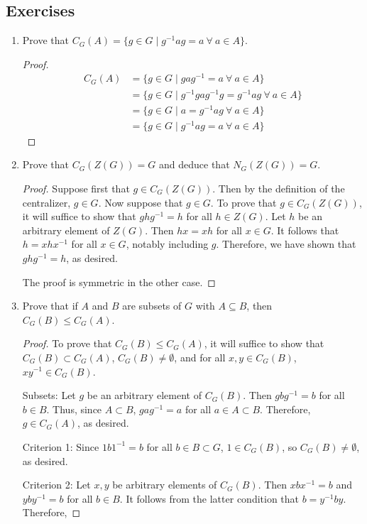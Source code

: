 \documentclass[../notes.tex]{subfiles}
\begin{document}
\subsection*{Exercises}
\begin{enumerate}[label={\textbf{\arabic*.}}]
    \item Prove that $C_G(A)=\{g\in G\mid g^{-1}ag=a\ \forall\ a\in A\}$.
    \begin{proof}
        \begin{align*}
            C_G(A) &= \{g\in G\mid gag^{-1}=a\ \forall\ a\in A\}\\
            &= \{g\in G\mid g^{-1}gag^{-1}g=g^{-1}ag\ \forall\ a\in A\}\\
            &= \{g\in G\mid a=g^{-1}ag\ \forall\ a\in A\}\\
            &= \{g\in G\mid g^{-1}ag=a\ \forall\ a\in A\}
        \end{align*}
    \end{proof}
    \item Prove that $C_G(Z(G))=G$ and deduce that $N_G(Z(G))=G$.
    \begin{proof}
        Suppose first that $g\in C_G(Z(G))$. Then by the definition of the centralizer, $g\in G$. Now suppose that $g\in G$. To prove that $g\in C_G(Z(G))$, it will suffice to show that $ghg^{-1}=h$ for all $h\in Z(G)$. Let $h$ be an arbitrary element of $Z(G)$. Then $hx=xh$ for all $x\in G$. It follows that $h=xhx^{-1}$ for all $x\in G$, notably including $g$. Therefore, we have shown that $ghg^{-1}=h$, as desired.\par
        The proof is symmetric in the other case.
    \end{proof}
    \item Prove that if $A$ and $B$ are subsets of $G$ with $A\subseteq B$, then $C_G(B)\leq C_G(A)$.
    \begin{proof}
        To prove that $C_G(B)\leq C_G(A)$, it will suffice to show that $C_G(B)\subset C_G(A)$, $C_G(B)\neq\emptyset$, and for all $x,y\in C_G(B)$, $xy^{-1}\in C_G(B)$.\par
        Subsets: Let $g$ be an arbitrary element of $C_G(B)$. Then $gbg^{-1}=b$ for all $b\in B$. Thus, since $A\subset B$, $gag^{-1}=a$ for all $a\in A\subset B$. Therefore, $g\in C_G(A)$, as desired.\par
        Criterion 1: Since $1b1^{-1}=b$ for all $b\in B\subset G$, $1\in C_G(B)$, so $C_G(B)\neq\emptyset$, as desired.\par
        Criterion 2: Let $x,y$ be arbitrary elements of $C_G(B)$. Then $xbx^{-1}=b$ and $yby^{-1}=b$ for all $b\in B$. It follows from the latter condition that $b=y^{-1}by$. Therefore,

\end{proof}
\end{enumerate}
\end{document}
